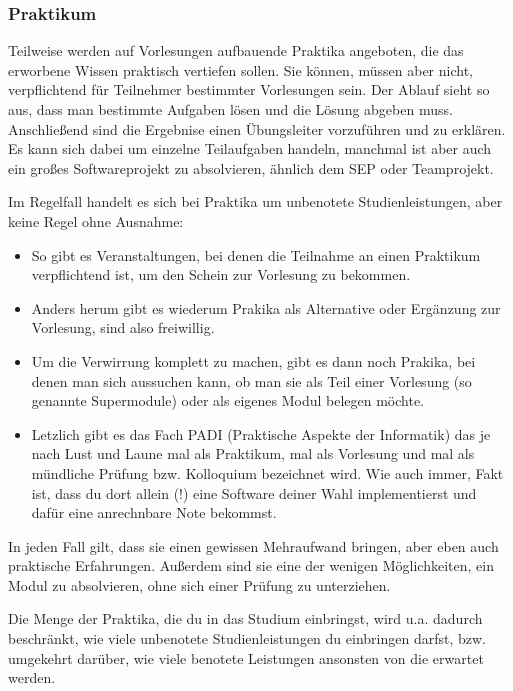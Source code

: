 \subsubsection*{Praktikum}
Teilweise werden auf Vorlesungen aufbauende Praktika angeboten, die
das erworbene Wissen praktisch vertiefen sollen. Sie können, müssen aber nicht,
verpflichtend für Teilnehmer bestimmter Vorlesungen sein. Der Ablauf
sieht so aus, dass man bestimmte Aufgaben lösen und die Lösung abgeben
muss. Anschließend sind die Ergebnise einen Übungsleiter vorzuführen
und zu erklären. Es kann sich dabei um einzelne Teilaufgaben handeln,
manchmal ist aber auch ein großes Softwareprojekt zu absolvieren, ähnlich dem
SEP oder Teamprojekt. 

Im Regelfall handelt es sich bei Praktika um
unbenotete Studienleistungen, aber keine Regel ohne Ausnahme: 
\begin{itemize}
\item So gibt es Veranstaltungen, bei denen die Teilnahme an einen Praktikum
verpflichtend ist, um den Schein zur Vorlesung zu bekommen. 
\item Anders
herum gibt es wiederum Prakika als Alternative oder Ergänzung zur
Vorlesung, sind also freiwillig. 
\item Um die Verwirrung komplett zu machen,
gibt es dann noch Prakika, bei denen man sich aussuchen kann, ob man
sie als Teil einer Vorlesung (so genannte Supermodule) oder als eigenes Modul belegen möchte.
\item Letzlich gibt es das Fach PADI (Praktische Aspekte der 
Informatik) das je nach Lust und Laune mal als Praktikum, mal 
als Vorlesung und mal als mündliche Prüfung bzw. Kolloquium bezeichnet 
wird. Wie auch immer, Fakt ist, dass du dort allein (!) eine Software deiner Wahl 
implementierst und dafür eine anrechnbare Note bekommst.
\end{itemize}
In jeden Fall gilt, dass sie einen gewissen Mehraufwand bringen, aber
eben auch praktische Erfahrungen. Außerdem sind sie eine der wenigen
Möglichkeiten, ein Modul zu absolvieren, ohne sich einer Prüfung zu
unterziehen.

Die Menge der Praktika, die du in das Studium einbringst, wird u.a. 
dadurch beschränkt, wie viele unbenotete Studienleistungen du einbringen 
darfst, bzw. umgekehrt darüber, wie viele benotete Leistungen ansonsten 
von die erwartet werden.

